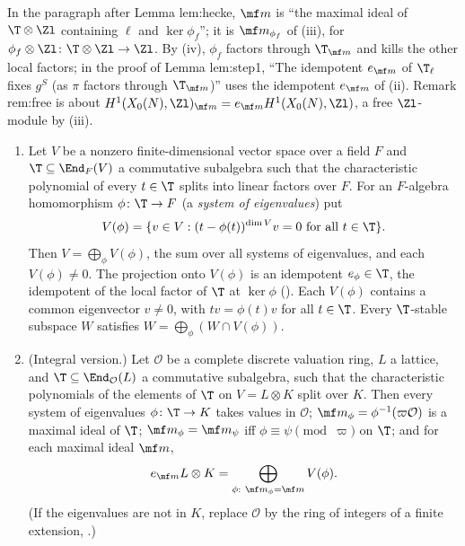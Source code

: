 \begin{paperlink}\label{pl:modules:tm}
In the paragraph after Lemma lem:hecke, $\mf m$ is ``the maximal ideal of $\T\otimes\Zl$ containing $\ell$ and $\ker\phi_f$''; it is $\mf m_{\phi_f}$ of
(iii), for $\phi_f\otimes\Zl\colon\T\otimes\Zl\to\Zl$. By (iv), $\phi_f$ factors through
$\T_{\mf m}$ and kills the other local factors; in the proof of Lemma lem:step1, ``The idempotent $e_{\mf m}$ of $\T_\ell$ fixes $g^S$ (as $\pi$ factors through
$\T_{\mf m}$)'' uses the idempotent $e_{\mf m}$ of (ii). Remark rem:free is about $H^1(X_0(N),\Zl)_{\mf m}=e_{\mf m}H^1(X_0(N),\Zl)$, a free $\Zl$-module by (iii).
\end{paperlink}

\begin{theorem}\label{thm:modules:generalised-eigenspaces}
\begin{enumerate}[label=(\roman*)]
\item Let $V$ be a nonzero finite-dimensional vector space over a field $F$ and $\T\subseteq\End_F(V)$ a commutative subalgebra such that the characteristic
polynomial of every $t\in\T$ splits into linear factors over $F$. For an $F$-algebra homomorphism $\phi\colon\T\to F$ (a \emph{system of eigenvalues}) put
\[
V(\phi)=\{v\in V:(t-\phi(t))^{\dim V}v=0\text{ for all }t\in\T\}.
\]
Then $V=\bigoplus_\phi V(\phi)$, the sum over all systems of eigenvalues, and each $V(\phi)\ne0$. The projection onto $V(\phi)$ is an idempotent $e_\phi\in\T$, the
idempotent of the local factor of $\T$ at $\ker\phi$ (). Each $V(\phi)$ contains a common eigenvector $v\ne0$, with $tv=\phi(t)v$ for
all $t\in\T$. Every $\T$-stable subspace $W$ satisfies $W=\bigoplus_\phi(W\cap V(\phi))$.
\item (Integral version.) Let $\mathcal O$ be a complete discrete valuation ring, $L$ a lattice, and $\T\subseteq\End_{\mathcal O}(L)$ a commutative subalgebra, such that the
characteristic polynomials of the elements of $\T$ on $V=L\otimes K$ split over $K$. Then every system of eigenvalues $\phi\colon\T\to K$ takes values in $\mathcal O$;
$\mf m_\phi=\phi^{-1}(\varpi\mathcal O)$ is a maximal ideal of $\T$; $\mf m_\phi=\mf m_\psi$ iff $\phi\equiv\psi\pmod\varpi$ on $\T$; and for each maximal ideal $\mf m$,
\[
e_{\mf m}L\otimes K=\bigoplus_{\phi:\ \mf m_\phi=\mf m}V(\phi).
\]
(If the eigenvalues are not in $K$, replace $\mathcal O$ by the ring of integers of a finite extension, .)
\end{enumerate}
\end{theorem}

